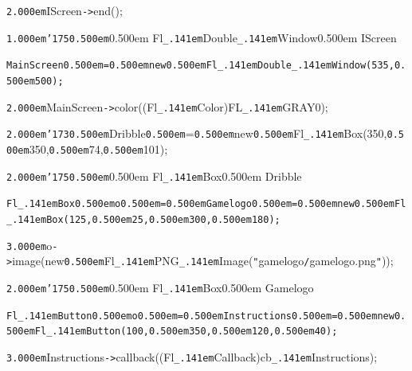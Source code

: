 \documentclass[12pt]{article}
\begin{document}
\noindent
{}{\tt\mc \kern2.000em}IScreen{\tt -}{\tt >}end();

\noindent
{}{\tt\mc \kern1.000em}{\tt\char'175}{\tt\mc \kern0.500em}\rm\mc {\tt /}{\tt /}\kern0.500em Fl{\tt\_\kern.141em}Double{\tt\_\kern.141em}Window{\tt *}\kern0.500em IScreen

\noindent
\tt{}MainScreen{\tt\mc \kern0.500em}={\tt\mc \kern0.500em}new{\tt\mc \kern0.500em}Fl{\tt\_\kern.141em}Double{\tt\_\kern.141em}Window(535,{\tt\mc \kern0.500em}500);

\noindent
{}{\tt\mc \kern2.000em}MainScreen{\tt -}{\tt >}color((Fl{\tt\_\kern.141em}Color)FL{\tt\_\kern.141em}GRAY0);

\noindent
{}{\tt\mc \kern2.000em}{\tt\char'173}{\tt\mc \kern0.500em}Dribble{\tt\mc \kern0.500em}={\tt\mc \kern0.500em}new{\tt\mc \kern0.500em}Fl{\tt\_\kern.141em}Box(350,{\tt\mc \kern0.500em}350,{\tt\mc \kern0.500em}74,{\tt\mc \kern0.500em}101);

\noindent
{}{\tt\mc \kern2.000em}{\tt\char'175}{\tt\mc \kern0.500em}\rm\mc {\tt /}{\tt /}\kern0.500em Fl{\tt\_\kern.141em}Box{\tt *}\kern0.500em Dribble

\noindent
\tt{}Fl{\tt\_\kern.141em}Box{\tt *}{\tt\mc \kern0.500em}o{\tt\mc \kern0.500em}={\tt\mc \kern0.500em}Gamelogo{\tt\mc \kern0.500em}={\tt\mc \kern0.500em}new{\tt\mc \kern0.500em}Fl{\tt\_\kern.141em}Box(125,{\tt\mc \kern0.500em}25,{\tt\mc \kern0.500em}300,{\tt\mc \kern0.500em}180);

\noindent
{}{\tt\mc \kern3.000em}o{\tt -}{\tt >}image(new{\tt\mc \kern0.500em}Fl{\tt\_\kern.141em}PNG{\tt\_\kern.141em}Image({\tt "}gamelogo{\tt /}gamelogo.png{\tt "}));

\noindent
{}{\tt\mc \kern2.000em}{\tt\char'175}{\tt\mc \kern0.500em}\rm\mc {\tt /}{\tt /}\kern0.500em Fl{\tt\_\kern.141em}Box{\tt *}\kern0.500em Gamelogo

\noindent
\tt{}Fl{\tt\_\kern.141em}Button{\tt *}{\tt\mc \kern0.500em}o{\tt\mc \kern0.500em}={\tt\mc \kern0.500em}Instructions{\tt\mc \kern0.500em}={\tt\mc \kern0.500em}new{\tt\mc \kern0.500em}Fl{\tt\_\kern.141em}Button(100,{\tt\mc \kern0.500em}350,{\tt\mc \kern0.500em}120,{\tt\mc \kern0.500em}40);

\noindent
{}{\tt\mc \kern3.000em}Instructions{\tt -}{\tt >}callback((Fl{\tt\_\kern.141em}Callback{\tt *})cb{\tt\_\kern.141em}Instructions);
\end{document}
